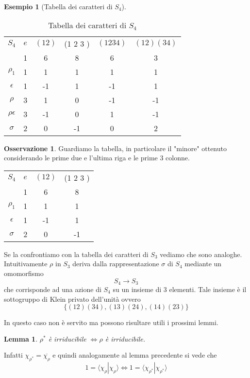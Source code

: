 \documentclass[11pt]{article}
\theoremstyle{plain}
\newtheorem{lemma}[thm]{Lemma}
\theoremstyle{definition}
\newtheorem{exmp}{Esempio}[section]
\newtheorem*{rem}{Osservazione}
\theoremstyle{remark}
\begin{document}
\begin{exmp}[Tabella dei caratteri di $S_4$]
\begin{table}[!ht] 
\centering
\begin{tabular}{|c|c|c|c|c|c|}
\hline
$S_4$  & $e$ & $(1 2)$ & (1 2 3 ) & $(1 2 3 4)$ & $(1 2)(3 4)$ \\
 & 1 & 6 & 8 & 6 & 3 \\
\hline
 $\rho_1$ & 1 & 1  & 1 & 1 & 1\\
\hline
$\epsilon$ & 1  & -1 & 1 & -1 & 1 \\
\hline
$\rho$& 3 & 1 & 0 & -1 & -1\\
\hline
$\rho\epsilon$& 3 & -1 & 0 & 1 & -1\\
\hline
 $\sigma$& 2&  0 & -1& 0 & 2\\
\hline
\end{tabular}
\caption{Tabella dei caratteri di $S_4$}
\label{tabella caratteri s4}
\end{table}


\begin{rem} Guardiamo la tabella, in particolare il "minore" ottenuto considerando le prime due e l'ultima riga e le prime 3 colonne. 

\begin{table}[!ht]
\centering
\begin{tabular}{|c|c|c|c|}
\hline
$S_4$  & $e$ & $(1 2)$ & (1 2 3 )    \\
 & 1 & 6 & 8 \\
\hline
 $\rho_1$ & 1 & 1  & 1 \\
\hline
$\epsilon$ & 1 & -1 & 1 \\
\hline
$\sigma$ & 2 & 0 & -1 \\
\hline
\end{tabular}
\end{table}
Se la confrontiamo con la tabella dei caratteri di $S_3$ vediamo che sono analoghe. Intuitivamente $\rho$ in $S_3$ deriva dalla rappresentazione $\sigma$ di $S_4$ mediante un omomorfismo 
\[
S_4\rightarrow S_3
\]
che corrisponde ad una azione di $S_4$ su un insieme di 3 elementi. Tale insieme è il sottogruppo di Klein privato dell'unità ovvero
\[
\{ (12)(34),(13)(24),(14)(23)\}
\]
\end{rem}


In questo caso non è servito ma possono risultare utili i prossimi lemmi.
\begin{lemma}
$\rho^* $ è irriducibile $ \Leftrightarrow \rho$ è irriducibile.
\end{lemma}
Infatti $\chi_{\rho^*}=\overline{\chi_\rho} $ e quindi analogamente al lemma precedente si vede che
\[
1=\langle\chi_{\rho}|\chi_{\rho}\rangle \Leftrightarrow 1=\langle\chi_{\rho^*}|\chi_{\rho^*}\rangle
\]


\end{exmp}
\end{document}
